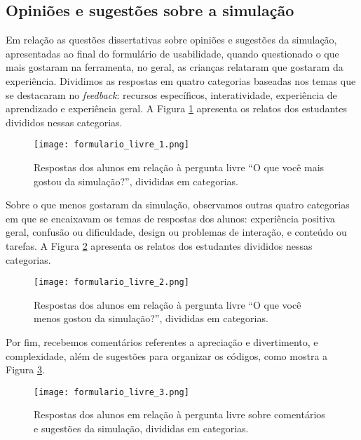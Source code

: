 \subsection*{Opiniões e sugestões sobre a simulação}

Em relação as questões dissertativas sobre opiniões e sugestões da simulação, apresentadas ao final do formulário de usabilidade, quando questionado o que mais gostaram na ferramenta, no geral, as crianças relataram que gostaram da experiência. Dividimos as respostas em quatro categorias baseadas nos temas que se destacaram no \textit{feedback}: recursos específicos, interatividade, experiência de aprendizado e experiência geral. A Figura \ref{figure:livre_1} apresenta os relatos dos estudantes divididos nessas categorias.

\begin{figure}[h!]
    \centering
    \texttt{[image: formulario\_livre\_1.png]}
    \caption{Respostas dos alunos em relação à pergunta livre \enquote{O que você mais gostou da simulação?}, divididas em categorias.}
    \label{figure:livre_1}
\end{figure}

Sobre o que menos gostaram da simulação, observamos outras quatro categorias em que se encaixavam os temas de respostas dos alunos: experiência positiva geral, confusão ou dificuldade, design ou problemas de interação, e conteúdo ou tarefas. A Figura \ref{figure:livre_2} apresenta os relatos dos estudantes divididos nessas categorias.

\begin{figure}[h!]
    \centering
    \texttt{[image: formulario\_livre\_2.png]}
    \caption{Respostas dos alunos em relação à pergunta livre \enquote{O que você menos gostou da simulação?}, divididas em categorias.}
    \label{figure:livre_2}
\end{figure}

Por fim, recebemos comentários referentes a apreciação e divertimento, e complexidade, além de sugestões para organizar os códigos, como mostra a Figura \ref{figure:livre_3}.

\begin{figure}[h!]
    \centering
    \texttt{[image: formulario\_livre\_3.png]}
    \caption{Respostas dos alunos em relação à pergunta livre sobre comentários e sugestões da simulação, divididas em categorias.}
    \label{figure:livre_3}
\end{figure}

